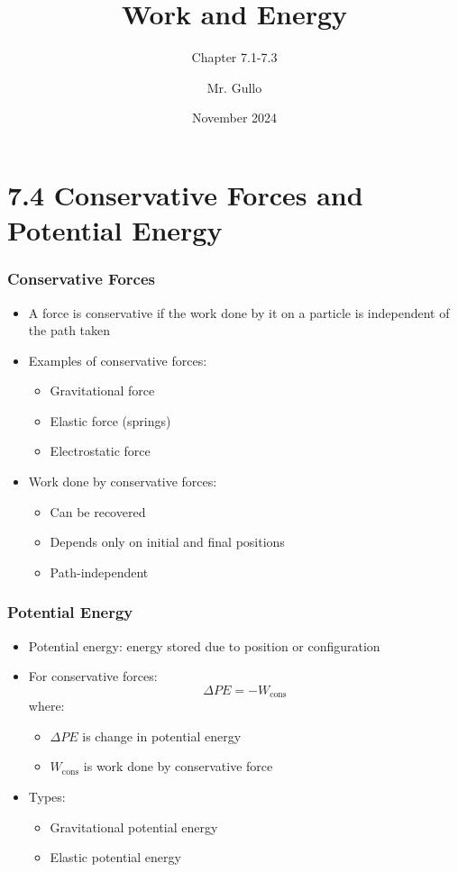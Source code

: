 \documentclass{beamer}
\title[PHYS12 CH7.4-7.6]{Work and Energy}
\subtitle{Chapter 7.1-7.3}
\author[Mr. Gullo]{Mr. Gullo}
\date[Nov 2024]{November 2024}
\begin{document}
\frame{\titlepage}

\section{7.4 Conservative Forces and Potential Energy}

\begin{frame}
\frametitle{Conservative Forces}
\begin{itemize}
    \item A force is conservative if the work done by it on a particle is independent of the path taken
    \item Examples of conservative forces:
    \begin{itemize}
        \item Gravitational force
        \item Elastic force (springs)
        \item Electrostatic force
    \end{itemize}
    \item Work done by conservative forces:
    \begin{itemize}
        \item Can be recovered
        \item Depends only on initial and final positions
        \item Path-independent
    \end{itemize}
\end{itemize}
\end{frame}

\begin{frame}
\frametitle{Potential Energy}
\begin{itemize}
    \item Potential energy: energy stored due to position or configuration
    \item For conservative forces:
    \[\Delta PE = -W_{\text{cons}}\]
    where:
    \begin{itemize}
        \item $\Delta PE$ is change in potential energy
        \item $W_{\text{cons}}$ is work done by conservative force
    \end{itemize}
    \item Types:
    \begin{itemize}
        \item Gravitational potential energy
        \item Elastic potential energy
    \end{itemize}
\end{itemize}
\end{frame}
\end{document}

